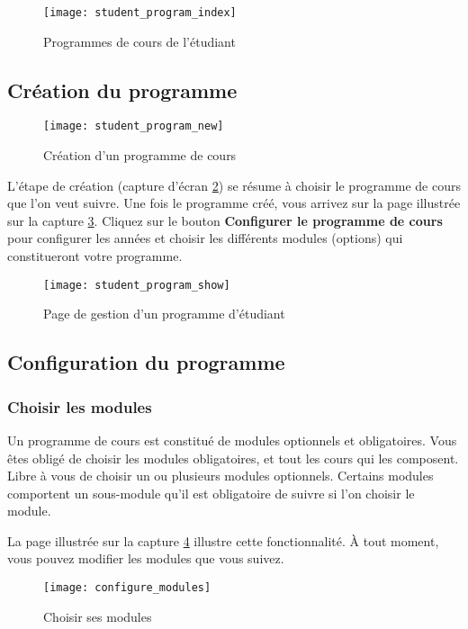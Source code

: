 \begin{figure}[htb]
\centering
\caption{Programmes de cours de l'étudiant}
\label{fig:student_program_index}
\texttt{[image: student\_program\_index]}
\end{figure}

\subsection{Création du programme}

\begin{figure}[htb]
\centering
\caption{Création d'un programme de cours}
\label{fig:student_program_new}
\texttt{[image: student\_program\_new]}
\end{figure}

L'étape de création (capture d'écran \ref{fig:student_program_new}) se résume à choisir le programme de cours que l'on veut suivre. Une fois le programme créé, vous arrivez sur la page illustrée sur la capture \ref{fig:student_program_mgmt}. Cliquez sur le bouton \textbf{Configurer le programme de cours} pour configurer les années et choisir les différents modules (options) qui constitueront votre programme.

\begin{figure}[htb]
\centering
\caption{Page de gestion d'un programme d'étudiant}
\label{fig:student_program_mgmt}
\texttt{[image: student\_program\_show]}
\end{figure}

\subsection{Configuration du programme}
\subsubsection{Choisir les modules}
Un programme de cours est constitué de modules optionnels et obligatoires. Vous êtes obligé de choisir les modules obligatoires, et tout les cours qui les composent. Libre à vous de choisir un ou plusieurs modules optionnels. Certains modules comportent un sous-module qu'il est obligatoire de suivre si l'on choisir le module.

La page illustrée sur la capture \ref{fig:configure_modules} illustre cette fonctionnalité. À tout moment, vous pouvez modifier les modules que vous suivez. 

\begin{figure}[htb]
\centering
\caption{Choisir ses modules}
\label{fig:configure_modules}
\texttt{[image: configure\_modules]}
\end{figure}

